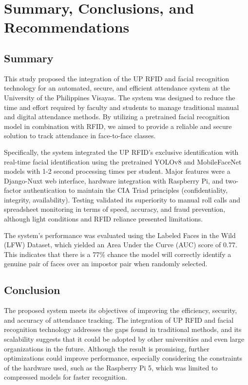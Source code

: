 \chapter{Summary, Conclusions, and Recommendations}

\section{Summary}

This study proposed the integration of the UP RFID and facial recognition technology for an automated, secure, and efficient attendance system at the University of the Philippines Visayas. The system was designed to reduce the time and effort required by faculty and students to manage traditional manual and digital attendance methods. By utilizing a pretrained facial recognition model in combination with RFID, we aimed to provide a reliable and secure solution to track attendance in face-to-face classes.

Specifically, the system integrated the UP RFID's exclusive identification with real-time facial identification using the pretrained YOLOv8 and MobileFaceNet models with 1-2 second processing times per student. Major features were a Django-Nuxt web interface, hardware integration with Raspberry Pi, and two-factor authentication to maintain the CIA Triad principles (confidentiality, integrity, availability). Testing validated its superiority to manual roll calls and spreadsheet monitoring in terms of speed, accuracy, and fraud prevention, although light conditions and RFID reliance presented limitations.

The system's performance was evaluated using the Labeled Faces in the Wild (LFW) Dataset, which yielded an Area Under the Curve (AUC) score of 0.77. This indicates that there is a 77\% chance the model will correctly identify a genuine pair of faces over an impostor pair when randomly selected. 

\section{Conclusion}

The proposed system meets its objectives of improving the efficiency, security, and accuracy of attendance tracking. The integration of UP RFID and facial recognition technology addresses the gaps found in traditional methods, and its scalability suggests that it could be adopted by other universities and even large organizations in the future. Although the result is promising, further optimizations could improve performance, especially considering the constraints of the hardware used, such as the Raspberry Pi 5, which was limited to compressed models for faster recognition.

